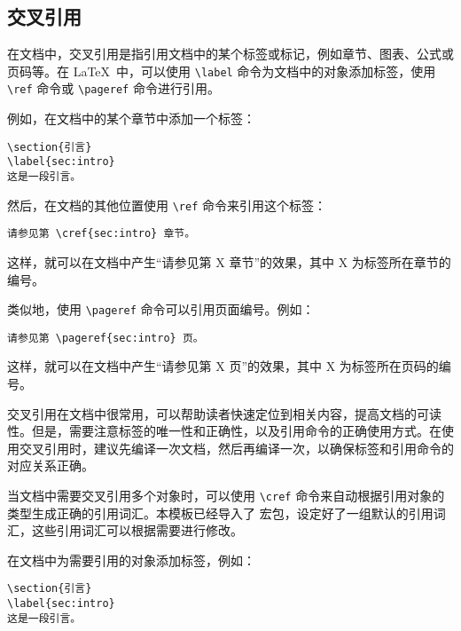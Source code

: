 \subsection{交叉引用}

在文档中，交叉引用是指引用文档中的某个标签或标记，例如章节、图表、公式或页码等。在 \LaTeX\ 中，可以使用 \verb|\label| 命令为文档中的对象添加标签，使用 \verb|\ref| 命令或 \verb|\pageref| 命令进行引用。

例如，在文档中的某个章节中添加一个标签：

\begin{Verbatim}
\section{引言}
\label{sec:intro}
这是一段引言。
\end{Verbatim}

然后，在文档的其他位置使用 \verb|\ref| 命令来引用这个标签：

\begin{Verbatim}
请参见第 \cref{sec:intro} 章节。
\end{Verbatim}

这样，就可以在文档中产生“请参见第 X 章节”的效果，其中 X 为标签所在章节的编号。

类似地，使用 \verb|\pageref| 命令可以引用页面编号。例如：

\begin{Verbatim}
请参见第 \pageref{sec:intro} 页。
\end{Verbatim}

这样，就可以在文档中产生“请参见第 X 页”的效果，其中 X 为标签所在页码的编号。

交叉引用在文档中很常用，可以帮助读者快速定位到相关内容，提高文档的可读性。但是，需要注意标签的唯一性和正确性，以及引用命令的正确使用方式。在使用交叉引用时，建议先编译一次文档，然后再编译一次，以确保标签和引用命令的对应关系正确。

当文档中需要交叉引用多个对象时，可以使用 \verb|\cref| 命令来自动根据引用对象的类型生成正确的引用词汇。本模板已经导入了  宏包，设定好了一组默认的引用词汇，这些引用词汇可以根据需要进行修改。

在文档中为需要引用的对象添加标签，例如：

\begin{Verbatim}
\section{引言}
\label{sec:intro}
这是一段引言。
\end{Verbatim}

